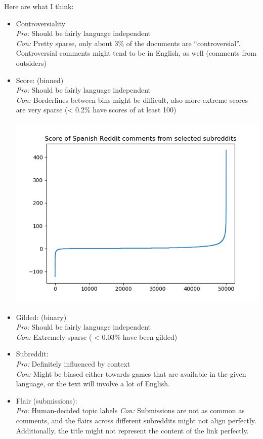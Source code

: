 \documentclass[11pt]{article} %
\begin{document}
Here are what I think:
\begin{itemize}
\item Controversiality \\
\emph{Pro:} Should be fairly language independent \\
\emph{Con:} Pretty sparse, only about 3\% of the documents are ``controversial''. Controversial comments might tend to be in English, as well (comments from outsiders)

\item Score: (binned) \\
\emph{Pro:} Should be fairly language independent \\
\emph{Con:} Borderlines between bins might be difficult, also more extreme scores are very sparse (< 0.2\% have scores of at least 100)

\includegraphics[scale=0.5]{spanish_score.png}

\item Gilded: (binary) \\
\emph{Pro:} Should be fairly language independent \\
\emph{Con:} Extremely sparse ( < 0.03\% have been gilded)

\item Subreddit: \\
\emph{Pro:} Definitely influenced by context \\
\emph{Con:} Might be biased either towards games that are available in the given language, or the text will involve a lot of English.

\item Flair (submissions): \\
\emph{Pro:} Human-decided topic labels
\emph{Con:} Submissions are not as common as comments, and the flairs across different subreddits might not align perfectly. Additionally, the title might not represent the content of the link perfectly.
\end{itemize}
\end{document}
